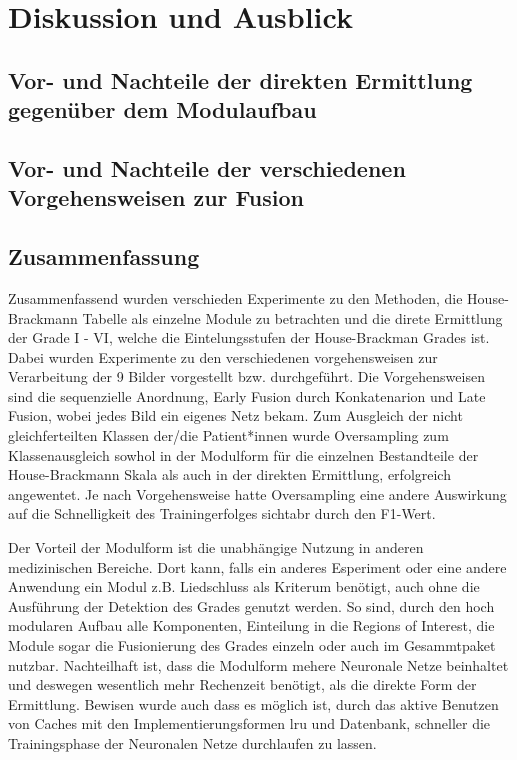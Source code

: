 \chapter{Diskussion und Ausblick}\label{discussion}

\section{Vor- und Nachteile der direkten Ermittlung gegenüber dem Modulaufbau}\label{di_vs_module}


\section{Vor- und Nachteile der verschiedenen Vorgehensweisen zur Fusion}\label{early_vs_late}

\clearpage
\section{Zusammenfassung}\label{conclude}
Zusammenfassend wurden verschieden Experimente zu den Methoden, die House-Brackmann Tabelle als einzelne Module zu betrachten und die direte Ermittlung der Grade I - VI, welche die Eintelungsstufen der House-Brackman Grades ist. Dabei wurden Experimente zu den verschiedenen vorgehensweisen zur Verarbeitung der 9 Bilder vorgestellt bzw. durchgeführt. Die Vorgehensweisen sind die sequenzielle Anordnung, Early Fusion durch Konkatenarion und Late Fusion, wobei jedes Bild ein eigenes Netz bekam. Zum Ausgleich der nicht gleichferteilten Klassen der/die Patient*innen wurde Oversampling zum Klassenausgleich sowhol in der Modulform für die einzelnen Bestandteile der House-Brackmann Skala als auch in der direkten Ermittlung, erfolgreich angewentet. Je nach Vorgehensweise hatte Oversampling eine andere Auswirkung auf die Schnelligkeit des Trainingerfolges sichtabr durch den F1-Wert.

Der Vorteil der Modulform ist die unabhängige Nutzung in anderen medizinischen Bereiche. Dort kann, falls ein anderes Esperiment oder eine andere Anwendung ein Modul z.B. Liedschluss als Kriterum benötigt, auch ohne die Ausführung der Detektion des Grades genutzt werden. So sind, durch den hoch modularen Aufbau alle Komponenten, Einteilung in die Regions of Interest, die Module sogar die Fusionierung des Grades einzeln oder auch im Gesammtpaket nutzbar. Nachteilhaft ist, dass die Modulform mehere Neuronale Netze beinhaltet und deswegen wesentlich mehr Rechenzeit benötigt, als die direkte Form der Ermittlung.
Bewisen wurde auch dass es möglich ist, durch das aktive Benutzen von Caches mit den Implementierungsformen \ac{lru} und Datenbank, schneller die Trainingsphase der Neuronalen Netze durchlaufen zu lassen.

